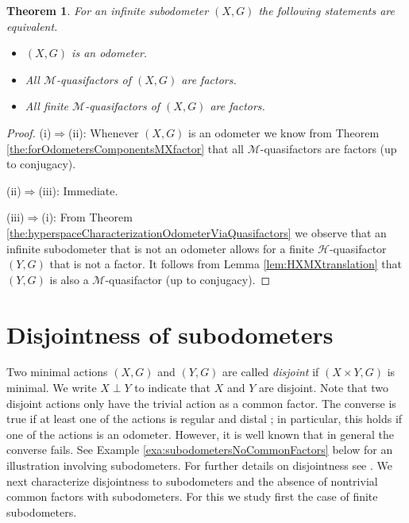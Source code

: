 \documentclass[12pt, reqno]{amsart}
\newtheorem{theorem}{Theorem}[section]
\theoremstyle{definition}
\theoremstyle{remark}
\numberwithin{equation}{section}
\theoremstyle{theorem}
\theoremstyle{remark}
\def\hyper{{\mathcal{H}}}
\begin{document}
\begin{theorem}
\label{the:MXcharacterizationOdometerViaMinimalComponents}
    For an infinite subodometer $(X,G)$ the following statements are equivalent.
    \begin{itemize}
        \item[(i)] $(X,G)$ is an odometer.
        \item[(ii)] All $\mathcal{M}$-quasifactors of $(X,G)$ are factors. 
        \item[(iii)] All finite $\mathcal{M}$-quasifactors of $(X,G)$ are factors. 
    \end{itemize}
\end{theorem}
\begin{proof}
(i)$\Rightarrow$(ii): 
    Whenever $(X,G)$ is an odometer we know from Theorem \ref{the:forOdometersComponentsMXfactor} that all $\mathcal{M}$-quasifactors are factors (up to conjugacy). 

(ii)$\Rightarrow$(iii):
    Immediate. 

(iii)$\Rightarrow$(i):
    From Theorem \ref{the:hyperspaceCharacterizationOdometerViaQuasifactors} we observe that an infinite subodometer that is not an odometer allows for a finite $\hyper$-quasifactor $(Y,G)$ that is not a factor. It follows from Lemma \ref{lem:HXMXtranslation} that $(Y,G)$ is also a $\mathcal{M}$-quasifactor (up to conjugacy). 
\end{proof}














\section{Disjointness of subodometers}
\label{sec:DisjointnessOfSubodometers}
Two minimal actions $(X,G)$ and $(Y,G)$ are called \emph{disjoint} if $(X\times Y,G)$ is minimal. We write $X\perp Y$ to indicate that $X$ and $Y$ are disjoint. 
Note that two disjoint actions only have the trivial action as a common factor. 
The converse is true if at least one of the actions is regular and distal \cite[Theorem~11.21]{auslander1988minimal}; in particular, this holds if one of the actions is an odometer. 
However, it is well known that in general the converse fails. 
See Example \ref{exa:subodometersNoCommonFactors} below for an illustration involving subodometers. 
For further details on disjointness see \cite[Chapter~11]{auslander1988minimal}. 
We next characterize disjointness to subodometers and the absence of nontrivial common factors with subodometers. 
For this we study first the case of finite subodometers. 
\end{document}

